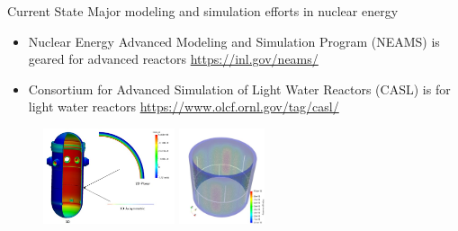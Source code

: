 \documentclass[xcolor=x11names,compress]{beamer}
\renewcommand{\(}{\begin{columns}}
\renewcommand{\)}{\end{columns}}
\newcommand{\<}[1]{\begin{column}{#1}}
\renewcommand{\>}{\end{column}}
\begin{document}
\begin{frame}{Current State}
Major modeling and simulation efforts in nuclear energy
\begin{itemize}
\item Nuclear Energy Advanced Modeling and Simulation Program (NEAMS) is geared for advanced reactors \url{https://inl.gov/neams/}
\item Consortium for Advanced Simulation of Light Water Reactors (CASL) is for light water reactors \url{https://www.olcf.ornl.gov/tag/casl/}
\end{itemize}
\begin{figure}
\includegraphics[height=1.1in,clip]{../figs/GrizzlyNEAMS}
\hspace*{3 em}
\includegraphics[height=1.1in,clip]{../figs/Grizzly2NEAMS}
\end{figure}

\end{frame}
\end{document}
